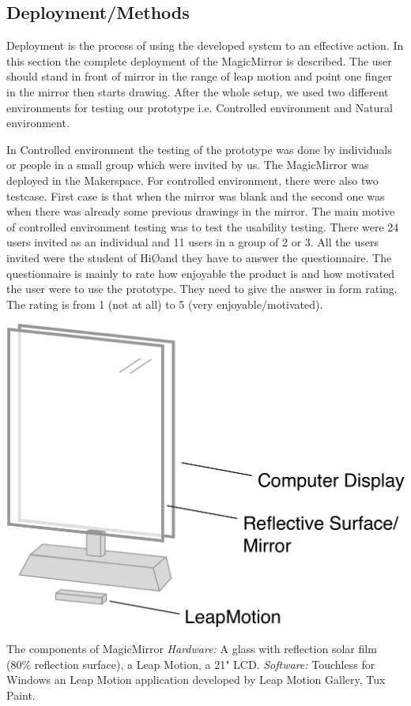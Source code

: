 \documentclass{sigchi-ext}
\begin{document}
\subsection{Deployment/Methods}
Deployment is the process of using the developed system to an effective action. In this section the complete deployment of the MagicMirror is described.
The user should stand in front of mirror in the range of leap motion and point one finger in the mirror then starts drawing.
After the whole setup, we used two different environments for testing our prototype i.e. Controlled environment and Natural environment.

In Controlled environment the testing of the prototype was done by individuals or people in a small group which were invited by us. The MagicMirror was deployed in the Makerspace. For controlled environment, there were also two testcase. First case is that when the mirror was blank and the second one was when there was already some previous drawings in the mirror. The main motive of controlled environment testing was to test the usability testing. There were 24 users invited as an individual and 11 users in a group of 2 or 3. All the users invited were the student of Hi\O  and they have to answer the questionnaire. The questionnaire is mainly to rate how enjoyable the product is and how motivated the user were to use the prototype. They need to give the answer in form rating. The rating is from 1 (not at all) to 5 (very enjoyable/motivated).

\begin{marginfigure}[-35pc]
  \begin{minipage}{\marginparwidth}
    \centering
    \includegraphics[width=0.9\marginparwidth]{images/cartoon}
  	\caption{
      	The components of MagicMirror
      	\textit{Hardware:}
        A glass with reflection solar film (80\% reflection surface), a Leap Motion, a 21" LCD.
        \textit{Software:}
        Touchless for Windows an Leap Motion application developed by Leap Motion Gallery, Tux Paint.
  	}
  \end{minipage}
\end{marginfigure}
 
\end{document}
